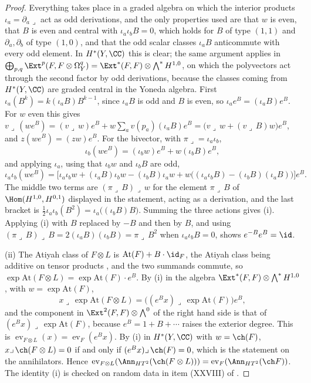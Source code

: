 \begin{proof}
Everything takes place in a graded algebra on which the interior products
$\iota_{a}=\partial_{a}\lrcorner$ act as odd derivations, and the only
properties used are that $w$ is even, that $B$ is even and central with
$\iota_{a}\iota_{b}B=0$, which holds for $B$ of type $(1,1)$ and
$\partial_{a},\partial_{b}$ of type $(1,0)$, and that the odd scalar classes
$\iota_{a}B$ anticommute with every odd element. In $H^{*}(Y,\CC)$ this is
clear; the same argument applies in
$\bigoplus_{p,q}\Ext^{p}(F,F\otimes\Omega^{q}_{Y})=\Ext^{*}(F,F)\otimes
\bigwedge^{*}H^{1,0}$, on which the polyvectors act through the second factor
by odd derivations, because the classes coming from $H^{*}(Y,\CC)$ are graded
central in the Yoneda algebra. First $\iota_{a}(B^{k})=k(\iota_{a}B)B^{k-1}$,
since $\iota_{a}B$ is odd and $B$ is even, so
$\iota_{a}e^{B}=(\iota_{a}B)e^{B}$. For $w$ even this gives
$v\lrcorner\,(we^{B})=(v\lrcorner\,w)e^{B}+w\sum_{a}v(p_{a})(\iota_{a}B)e^{B}
=\bigl(v\lrcorner\,w+(v\lrcorner\,B)w\bigr)e^{B}$, and
$z(we^{B})=(zw)e^{B}$. For the bivector, with $\pi\lrcorner=\iota_{a}\iota_{b}$,
\[
  \iota_{b}(we^{B})=(\iota_{b}w)e^{B}+w(\iota_{b}B)e^{B},
\]
and applying $\iota_{a}$, using that $\iota_{b}w$ and $\iota_{b}B$ are odd,
\[
  \iota_{a}\iota_{b}(we^{B})
  =\bigl[\iota_{a}\iota_{b}w
   +(\iota_{a}B)\iota_{b}w-(\iota_{b}B)\iota_{a}w
   +w\bigl((\iota_{a}\iota_{b}B)-(\iota_{b}B)(\iota_{a}B)\bigr)\bigr]e^{B}.
\]
The middle two terms are $(\pi\lrcorner\,B)\lrcorner\,w$ for the element
$\pi\lrcorner\,B$ of $\Hom(H^{1,0},H^{0,1})$ displayed in the statement, acting
as a derivation, and the last bracket is
$\tfrac12\iota_{a}\iota_{b}(B^{2})=\iota_{a}\bigl((\iota_{b}B)B\bigr)$.
Summing the three actions gives (i). Applying (i) with $B$ replaced by $-B$
and then by $B$, and using
$(\pi\lrcorner\,B)\lrcorner\,B=2(\iota_{a}B)(\iota_{b}B)=\pi\lrcorner\,B^{2}$
when $\iota_{a}\iota_{b}B=0$, shows $e^{-B}e^{B}=\id$.

(ii) The Atiyah class of $F\otimes L$ is $\mathrm{At}(F)+B\cdot\id_{F}$,
the Atiyah class being additive on tensor products \cite[Section 3]{BF03},
and the two summands commute, so
$\exp\mathrm{At}(F\otimes L)=\exp\mathrm{At}(F)\cdot e^{B}$. By (i) in the
algebra $\Ext^{*}(F,F)\otimes\bigwedge^{*}H^{1,0}$, with $w=\exp\mathrm{At}(F)$,
\[
  x\lrcorner\,\exp\mathrm{At}(F\otimes L)
  =\bigl((e^{B}x)\lrcorner\,\exp\mathrm{At}(F)\bigr)e^{B},
\]
and the component in $\Ext^{2}(F,F)\otimes\bigwedge^{0}$ of the right hand
side is that of $(e^{B}x)\lrcorner\,\exp\mathrm{At}(F)$, because $e^{B}=1+B+\cdots$
raises the exterior degree. This is
$\operatorname{ev}_{F\otimes L}(x)=\operatorname{ev}_{F}(e^{B}x)$. By (i) in
$H^{*}(Y,\CC)$ with $w=\ch(F)$, $x\lrcorner\,\ch(F\otimes L)=0$ if and only
if $(e^{B}x)\lrcorner\,\ch(F)=0$, which is the statement on the annihilators.
Hence $\operatorname{ev}_{F\otimes L}(\Ann_{HT^{2}}(\ch(F\otimes L)))
=\operatorname{ev}_{F}(\Ann_{HT^{2}}(\ch F))$. The identity (i) is checked
on random data in item (XXVIII) of .
\end{proof}

